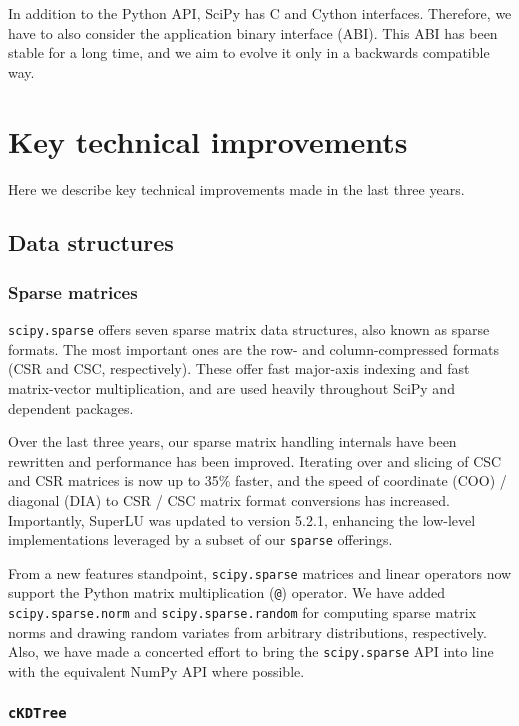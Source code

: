 \documentclass[fleqn,10pt]{wlscirep}
\begin{document}
In addition to the Python API, SciPy has C and Cython interfaces.
Therefore, we have to also consider the application binary
interface (ABI). This ABI has been stable for a long time, and we aim to
evolve it only in a backwards compatible way.

\section*{Key technical improvements}
\label{sec:technical_improvements}
Here we describe key technical improvements made in the last three years.

\subsection*{Data structures}

\subsubsection*{Sparse matrices}

\texttt{scipy.sparse} offers seven sparse matrix data structures,
also known as sparse formats. The most important ones are the row-
and column-compressed formats (CSR and CSC, respectively).
These offer fast major-axis indexing and fast matrix-vector multiplication,
and are used heavily throughout SciPy and dependent packages.

Over the last three years, our sparse matrix handling internals have been
rewritten and performance has been improved. Iterating over and slicing of CSC
and CSR matrices is now up to 35\% faster, %
and the speed of coordinate (COO) / diagonal (DIA) to CSR / CSC matrix format
conversions has increased. %
Importantly,
SuperLU\cite{superlu_ug99} was updated to version 5.2.1, enhancing the
low-level implementations leveraged by a subset of our \texttt{sparse}
offerings.

From a new features standpoint, \texttt{scipy.sparse} matrices and linear
operators now support the Python matrix multiplication (\texttt{@}) operator.
We have added \texttt{scipy.sparse.norm} and
\texttt{scipy.sparse.random} for computing sparse matrix norms and drawing
random variates from arbitrary distributions, respectively. Also, we have made a
concerted effort to bring the \texttt{scipy.sparse} API into line with the
equivalent NumPy API where possible.

\subsubsection*{\texttt{cKDTree}}
\end{document}
